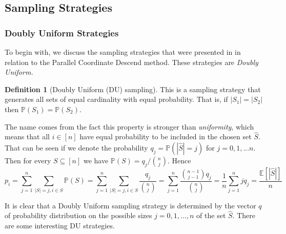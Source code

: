 \documentclass{article}
\theoremstyle{definition}
\newtheorem{definition}{Definition}
\theoremstyle{assumption}
\theoremstyle{lemma}
\theoremstyle{theorem}
\theoremstyle{proposition}
\begin{document}
	
	\subsection{Sampling Strategies}
	
	\subsubsection{Doubly Uniform Strategies}
	
	To begin with, we discuss the sampling strategies that were presented in \cite{richtarik2016parallel} in relation to the Parallel Coordinate Descend method. These strategies are \textit{Doubly Uniform.}
	
	\begin{definition}[Doubly Uniform (DU) sampling] \label{DU}
		This is a sampling strategy that generates all sets of equal cardinality with equal probability. That is, if $|S_1| = |S_2|$ then $\mathbb P(S_1) = \mathbb P(S_2)$.
	\end{definition}

	The name comes from the fact this property is stronger than \textit{uniformity}, which means that all $i \in [n]$ have equal probability to be included in the chosen set $\hat S$. That can be seen if we denote the probability $q_j = \mathbb P(|\hat S| = j)$ for $j = 0, 1, ... n$. Then for every $S \subseteq [n]$ we have $\mathbb P(S) = q_j / \binom{n}{j}$. Hence
	\begin{equation}
		p_i = \sum \limits_{j=1}^n \sum \limits_{|S|=j, i \in S} \mathbb P(S) = \sum \limits_{j=1}^n \sum \limits_{|S|=j, i \in S} \frac{q_j}{\binom{n}{j}} = \sum \limits_{j=1}^n   \frac{\binom{n-1}{j-1}q_j}{\binom{n}{j}} = \frac{1}{n} \sum \limits_{j=1}^n j q_j = \frac{\mathbb E[|\hat S|]}{n}
	\end{equation}
	
	It is clear that a Doubly Uniform sampling strategy is determined by the vector $q$ of probability distribution on the possible sizes $j = 0, 1, ..., n$ of the set $\hat S$. There are some interesting DU strategies.
	
\end{document}
